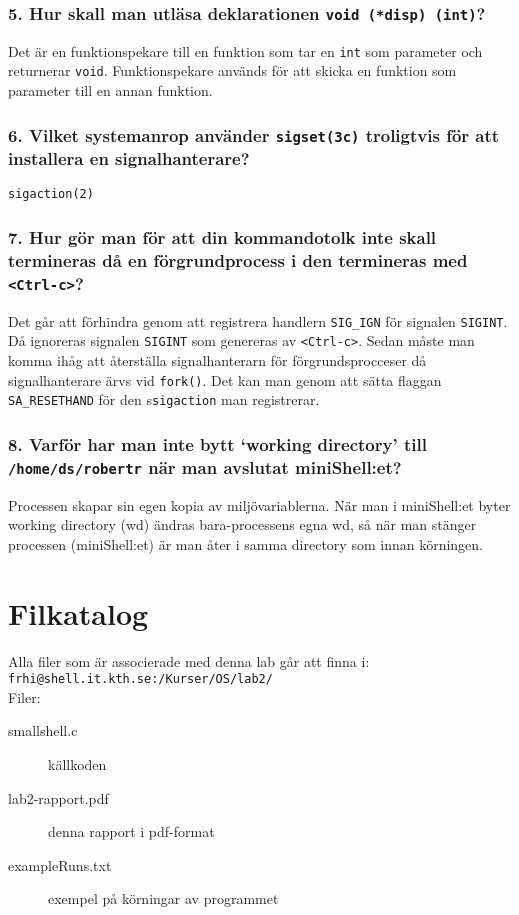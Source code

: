 \documentclass[a4paper]{article}
\begin{document}
\subsubsection*{5. Hur skall man utläsa deklarationen \texttt{void (*disp) (int)}?}
Det är en funktionspekare till en funktion som tar en \texttt{int} som parameter och returnerar \texttt{void}. Funktionspekare används för att skicka en funktion som parameter till en annan funktion.

\subsubsection*{6. Vilket systemanrop använder \texttt{sigset(3c)} troligtvis för att installera en signalhanterare?}
\texttt{sigaction(2)} 

\subsubsection*{7. Hur gör man för att din kommandotolk inte skall termineras då en förgrundprocess i den termineras med \texttt{<Ctrl-c>}?}
Det går att förhindra genom att registrera handlern \texttt{SIG_IGN} för signalen \texttt{SIGINT}. Då ignoreras signalen \texttt{SIGINT} 
som genereras av \texttt{<Ctrl-c>}. Sedan måste man komma ihåg att återställa signalhanterarn för förgrundsprocceser då signalhanterare ärvs vid \texttt{fork()}. 
Det kan man genom att sätta flaggan \texttt{SA_RESETHAND} för den s\texttt{sigaction} man registrerar.
 

\subsubsection*{8. Varför har man inte bytt `working directory' till \texttt{/home/ds/robertr} när man avslutat miniShell:et?}
Processen skapar sin egen kopia av miljövariablerna. När man i miniShell:et byter working directory (wd) ändras bara-processens egna wd, så när man stänger processen (miniShell:et) är man åter i samma directory som innan körningen.

\section*{Filkatalog}
Alla filer som är associerade med denna lab går att finna i:\\
\texttt{frhi@shell.it.kth.se:/Kurser/OS/lab2/}
\\
Filer:
\begin{description}
\item[smallshell.c] källkoden
\item[lab2-rapport.pdf] denna rapport i pdf-format
\item[exampleRuns.txt] exempel på körningar av programmet
\end{description}
\end{document}
